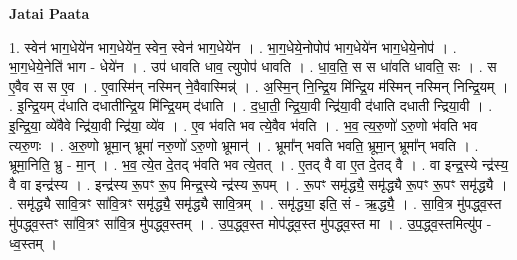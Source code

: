 \documentclass[17pt]{extarticle}
\begin{document}
\textbf{Jatai Paata} \newline

1. स्वेन॑ भाग॒धेये॑न भाग॒धेये॑न॒ स्वेन॒ स्वेन॑ भाग॒धेये॑न । . भा॒ग॒धेये॒नोपोप॑ भाग॒धेये॑न भाग॒धेये॒नोप॑ । . भा॒ग॒धेये॒नेति॑ भाग - धेये॑न । . उप॑ धावति धाव॒ त्युपोप॑ धावति । . धा॒व॒ति॒ स स धा॑वति धावति॒ सः । . स ए॒वैव स स ए॒व । . ए॒वास्मि॑न् नस्मिन् ने॒वैवास्मिन्न्॑ । . अ॒स्मि॒न् नि॒न्द्रि॒य मि॑न्द्रि॒य म॑स्मिन् नस्मिन् निन्द्रि॒यम् । . इ॒न्द्रि॒यम् द॑धाति दधातीन्द्रि॒य मि॑न्द्रि॒यम् द॑धाति । . द॒धा॒ती॒ न्द्रि॒या॒वी न्द्रि॑या॒वी द॑धाति दधाती न्द्रिया॒वी । . इ॒न्द्रि॒या॒ व्ये॑वैवे न्द्रि॑या॒वी न्द्रि॑या॒ व्ये॑व । . ए॒व भ॑वति भव त्ये॒वैव भ॑वति । . भ॒व॒ त्य॒रु॒णो॑ ऽरु॒णो भ॑वति भव त्यरु॒णः । . अ॒रु॒णो भ्रूमा॒न् भ्रूमा॑ नरु॒णो॑ ऽरु॒णो भ्रूमान्॑ । . भ्रूमा᳚न् भवति भवति॒ भ्रूमा॒न् भ्रूमा᳚न् भवति । . भ्रूमा॒निति॒ भ्रु - मा॒न् । . भ॒व॒ त्ये॒त दे॒तद् भ॑वति भव त्ये॒तत् । . ए॒तद् वै वा ए॒त दे॒तद् वै । . वा इन्द्र॒स्ये न्द्र॑स्य॒ वै वा इन्द्र॑स्य । . इन्द्र॑स्य रू॒पꣳ रू॒प मिन्द्र॒स्ये न्द्र॑स्य रू॒पम् । . रू॒पꣳ समृ॑द्ध्यै॒ समृ॑द्ध्यै रू॒पꣳ रू॒पꣳ समृ॑द्ध्यै । . समृ॑द्ध्यै सावि॒त्रꣳ सा॑वि॒त्रꣳ समृ॑द्ध्यै॒ समृ॑द्ध्यै सावि॒त्रम् । . समृ॑द्ध्या॒ इति॒ सं - ऋ॒द्ध्यै॒ । . सा॒वि॒त्र मु॑पद्ध्व॒स्त मु॑पद्ध्व॒स्तꣳ सा॑वि॒त्रꣳ सा॑वि॒त्र मु॑पद्ध्व॒स्तम् । . उ॒प॒द्ध्व॒स्त मोप॑द्ध्व॒स्त मु॑पद्ध्व॒स्त मा । . उ॒प॒द्ध्व॒स्तमित्यु॑प - ध्व॒स्तम् । \newline
\end{document}
